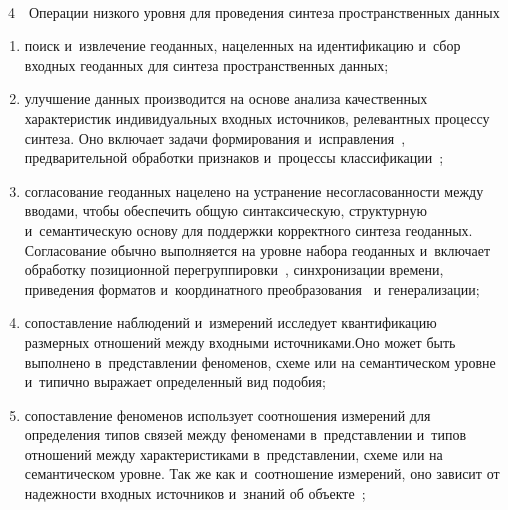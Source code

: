 \begin{multicols}{2}


{ \begin{center}  %
 \vspace*{-6pt}
   \mbox{%
 \epsfxsize=78mm 
 }


\end{center}

\vspace*{-12pt}


\noindent
{{\figurename~4}\ \ \small{Операции низкого уровня для проведения синтеза пространственных данных}}
}


\addtocounter{figure}{1}


\noindent
     \begin{enumerate}[(1)]
\item поиск и~извлечение геоданных, нацеленных на идентификацию и~сбор 
входных геоданных для синтеза пространственных данных; 
\item улучшение данных производится на основе анализа качественных 
характеристик индивидуальных входных источников, релевантных процессу 
синтеза. Оно включает задачи формирования и~исправления~\cite{9-dul, 10-dul}, 
предварительной обработки признаков и~процессы  
классификации~\cite{11-dul}; 
\item согласование геоданных нацелено на устранение несогласованности 
между вводами, чтобы обеспечить общую синтаксическую, структурную 
и~семантическую основу для поддержки корректного синтеза геоданных. 
Согласование обычно выполняется на уровне набора геоданных и~включает 
обработку позиционной перегруппировки~\cite{4-dul}, синхронизации 
времени, приведения форматов и~координатного  
преобразования~\cite{12-dul} и~генерализации;
\item сопоставление наблюдений и~измерений исследует квантификацию 
размерных отно\-шений между входными источниками.\linebreak Оно может быть 
выполнено в~пред\-став\-ле\-нии феноменов, схеме или на семантическом уровне 
и~типично выражает определенный вид подобия; 
\item сопоставление феноменов использует соотношения измерений для 
определения типов связей между феноменами в~пред\-став\-ле\-нии и~типов 
отношений между характеристиками в~пред\-став\-ле\-нии, схеме или на 
семантическом уровне. Так же как и~соотношение измерений, оно зависит от 
надежности входных источников и~знаний об объекте~\cite{13-dul};

\end{enumerate}
\end{multicols}
